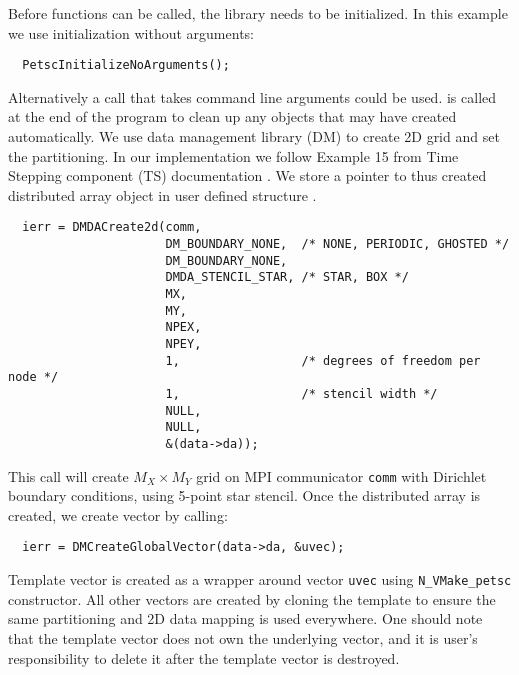 Before {\petsc} functions can be called, the library needs to be initialized. 
In this example we use initialization without arguments:
\begin{verbatim}
  PetscInitializeNoArguments(); 
\end{verbatim}
Alternatively a call that takes {\petsc} command line arguments could be used.
 is called at the end of the program to clean up any 
objects that {\petsc} may have created automatically. 
We use {\petsc} data management library (DM) to create 2D grid and set 
the partitioning. In our implementation we follow Example 15 from 
{\petsc} Time Stepping component (TS) documentation \cite{petsc-web-page}. 
We store a pointer to thus created {\petsc} distributed array object 
in user defined structure .
\begin{verbatim}
  ierr = DMDACreate2d(comm, 
                      DM_BOUNDARY_NONE,  /* NONE, PERIODIC, GHOSTED */
                      DM_BOUNDARY_NONE,
                      DMDA_STENCIL_STAR, /* STAR, BOX */
                      MX,                
                      MY,                
                      NPEX,              
                      NPEY,              
                      1,                 /* degrees of freedom per node */
                      1,                 /* stencil width */
                      NULL,              
                      NULL,              
                      &(data->da));
\end{verbatim}
This call will create $M_X \times M_Y$ grid on MPI communicator \verb|comm|
with Dirichlet boundary conditions, using 5-point star stencil. Once 
the distributed array is created, we create {\petsc} vector by calling:
\begin{verbatim}
  ierr = DMCreateGlobalVector(data->da, &uvec);
\end{verbatim}
Template vector  is created as a wrapper around {\petsc} vector 
\verb|uvec| using \verb|N_VMake_petsc| constructor. All other vectors are 
created by cloning the template to ensure the same partitioning and 2D data 
mapping is used everywhere. One should note that the template vector does 
not own the underlying {\petsc} vector, and it is user's responsibility to 
delete it after the template vector is destroyed.

